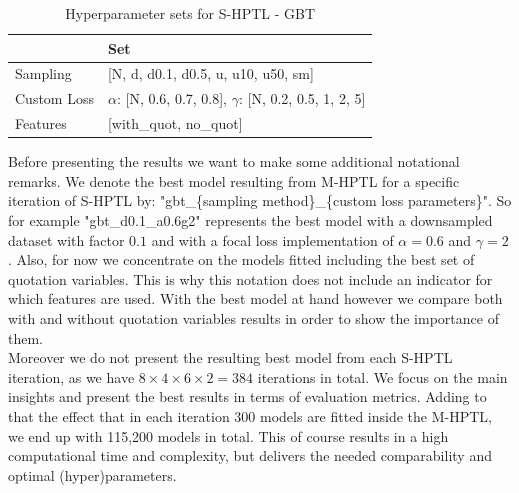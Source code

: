 \documentclass[12pt,titlepage]{article}
\begin{document}
\begin{table}
    \centering
    \caption{Hyperparameter sets for S-HPTL - GBT}
    \begin{tabular}{|l|l|}
    \hline
              & Set  \\
    \hline
    Sampling &  [N, d, d0.1, d0.5, u, u10, u50, sm]  \\
    Custom Loss & $\alpha$: [N, 0.6, 0.7, 0.8], $\gamma$: [N, 0.2, 0.5, 1, 2, 5] \\
    Features & [with\_quot, no\_quot] \\
    \hline
    \end{tabular}
\end{table}

Before presenting the results we want to make some additional notational remarks. We denote the best model resulting from M-HPTL for a specific iteration of S-HPTL by: "gbt\_\{sampling method\}\_\{custom loss parameters\}". So for example "gbt\_d0.1\_a0.6g2" represents the best model with a downsampled dataset with factor $0.1$ and with a focal loss implementation of $\alpha=0.6$ and $\gamma=2$. Also, for now we concentrate on the models fitted including the best set of quotation variables. This is why this notation does not include an indicator for which features are used. With the best model at hand however we compare both with and without quotation variables results in order to show the importance of them. \\
Moreover we do not present the resulting best model from each S-HPTL iteration, as we have $8\times4\times6\times2=384$ iterations in total. We focus on the main insights and present the best results in terms of evaluation metrics. Adding to that the effect that in each iteration 300 models are fitted inside the M-HPTL, we end up with 115,200 models in total. This of course results in a high computational time and complexity, but delivers the needed comparability and optimal (hyper)parameters. \\
\end{document}
